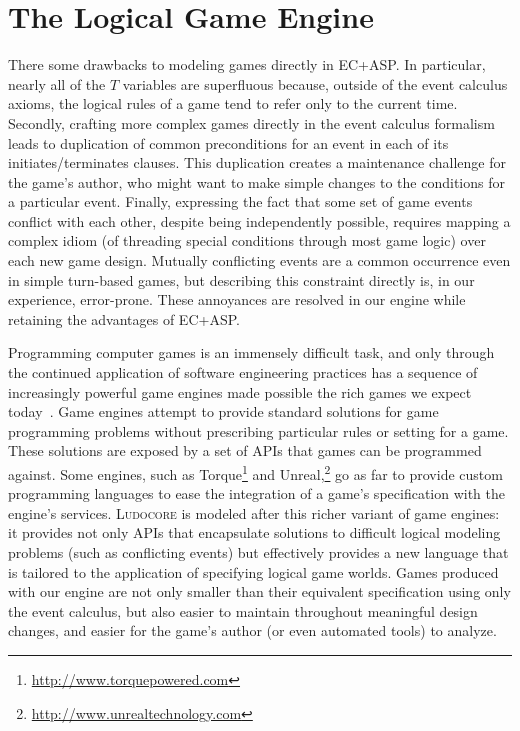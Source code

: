 \documentclass[letterpaper]{article}
\newcommand{\Ludocore}{\textsc{Ludocore}}
\begin{document}
\section{The Logical Game Engine}

There some drawbacks to modeling games directly in EC+ASP. In particular,
nearly all of the $T$ variables are superfluous because, outside of the event
calculus axioms, the logical rules of a game tend to refer only to the current
time. Secondly, crafting more complex games directly in the event
calculus formalism leads to duplication of common preconditions for an event in
each of its initiates/terminates clauses. This duplication creates a
maintenance challenge for the game's author, who might want to make simple
changes to the conditions for a particular event. Finally, expressing the fact
that some set of game events conflict with each other, despite being
independently possible, requires mapping a complex idiom (of threading special
conditions through most game logic) over each new game design. Mutually
conflicting events are a common occurrence even in simple turn-based games,
but describing this constraint directly is, in our experience, error-prone.
These annoyances are resolved in our engine while retaining the advantages
of EC+ASP.

Programming computer games is an immensely difficult task, and only through the
continued application of software engineering practices has a sequence of
increasingly powerful game engines made possible the rich games we expect
today~\citep{Blow:Harder}. Game engines attempt to provide standard solutions
for game programming problems without prescribing particular rules or setting
for a game. These solutions are exposed by a set of APIs that games can be
programmed against. Some engines, such as
Torque\footnote{\url{http://www.torquepowered.com}} and
Unreal,\footnote{\url{http://www.unrealtechnology.com}} go as far to provide
custom programming languages to ease the integration of a game's specification
with the engine's services. \Ludocore{} is modeled after this richer variant of
game engines: it provides not only APIs that encapsulate solutions to difficult
logical modeling problems (such as conflicting events) but effectively provides
a new language that is tailored to the application of specifying logical game
worlds. Games produced with our engine are not only smaller than their
equivalent specification using only the event calculus, but also easier to maintain
throughout meaningful design changes, and easier for the game's author (or even
automated tools) to analyze.
\end{document}

